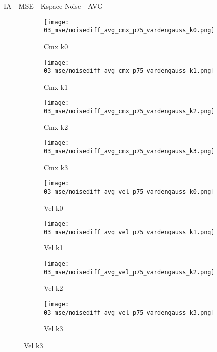\documentclass{beamer}
\begin{document}
\begin{frame}{IA - MSE - Kspace Noise - AVG}{}
\begin{figure}
\begin{subfigure}{0.24\textwidth}
\texttt{[image: 03\_mse/noisediff\_avg\_cmx\_p75\_vardengauss\_k0.png]}
\vspace{-20pt}
\caption*{\tiny Cmx k0}
\end{subfigure}
\begin{subfigure}{0.24\textwidth}
\texttt{[image: 03\_mse/noisediff\_avg\_cmx\_p75\_vardengauss\_k1.png]}
\vspace{-20pt}
\caption*{\tiny Cmx k1}
\end{subfigure}
\begin{subfigure}{0.24\textwidth}
\texttt{[image: 03\_mse/noisediff\_avg\_cmx\_p75\_vardengauss\_k2.png]}
\vspace{-20pt}
\caption*{\tiny Cmx k2}
\end{subfigure}
\begin{subfigure}{0.24\textwidth}
\texttt{[image: 03\_mse/noisediff\_avg\_cmx\_p75\_vardengauss\_k3.png]}
\vspace{-20pt}
\caption*{\tiny Cmx k3}
\end{subfigure}

\begin{subfigure}{0.24\textwidth}
\texttt{[image: 03\_mse/noisediff\_avg\_vel\_p75\_vardengauss\_k0.png]}
\vspace{-20pt}
\caption*{\tiny Vel k0}
\end{subfigure}
\begin{subfigure}{0.24\textwidth}
\texttt{[image: 03\_mse/noisediff\_avg\_vel\_p75\_vardengauss\_k1.png]}
\vspace{-20pt}
\caption*{\tiny Vel k1}
\end{subfigure}
\begin{subfigure}{0.24\textwidth}
\texttt{[image: 03\_mse/noisediff\_avg\_vel\_p75\_vardengauss\_k2.png]}
\vspace{-20pt}
\caption*{\tiny Vel k2}
\end{subfigure}
\begin{subfigure}{0.24\textwidth}
\texttt{[image: 03\_mse/noisediff\_avg\_vel\_p75\_vardengauss\_k3.png]}
\vspace{-20pt}
\caption*{\tiny Vel k3}
\end{subfigure}
\end{figure}
\end{frame}
\end{document}
